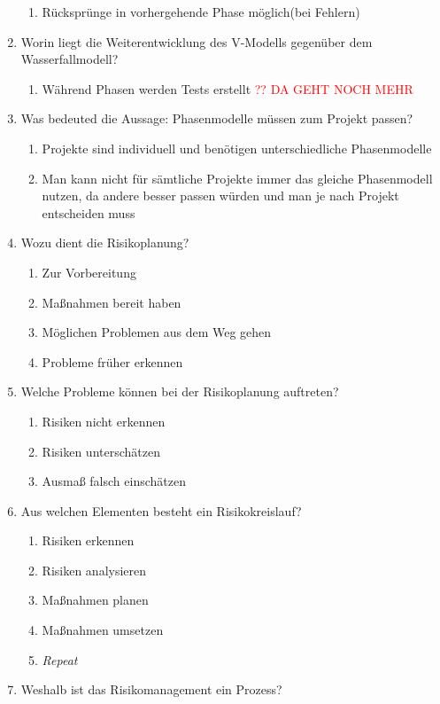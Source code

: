 \documentclass[12pt,a4paper]{article}
\begin{document}
\begin{enumerate}
	\begin{enumerate}
		\item Rücksprünge in vorhergehende Phase möglich(bei Fehlern)
	\end{enumerate}
	\item Worin liegt die Weiterentwicklung des V-Modells gegenüber dem Wasserfallmodell?
	\begin{enumerate}
		\item Während Phasen werden Tests erstellt \textcolor{red}{?? DA GEHT NOCH MEHR}
	\end{enumerate}
	\item Was bedeuted die Aussage: Phasenmodelle müssen zum Projekt passen?
	\begin{enumerate}
		\item Projekte sind individuell und benötigen unterschiedliche Phasenmodelle
		\item Man kann nicht für sämtliche Projekte immer das gleiche Phasenmodell nutzen, da andere besser passen würden und man je nach Projekt entscheiden muss
	\end{enumerate}
	\item Wozu dient die Risikoplanung?
	\begin{enumerate}
		\item Zur Vorbereitung
		\item Maßnahmen bereit haben
		\item Möglichen Problemen aus dem Weg gehen
		\item Probleme früher erkennen
	\end{enumerate}
	\item Welche Probleme können bei der Risikoplanung auftreten?
	\begin{enumerate}
		\item Risiken nicht erkennen
		\item Risiken unterschätzen
		\item Ausmaß falsch einschätzen
	\end{enumerate}
	\item Aus welchen Elementen besteht ein Risikokreislauf?
	\begin{enumerate}
		\item Risiken erkennen
		\item Risiken analysieren
		\item Maßnahmen planen 
		\item Maßnahmen umsetzen
		\item \textit{Repeat}
	\end{enumerate}
	\item Weshalb ist das Risikomanagement ein Prozess?

\end{enumerate}
\end{document}
